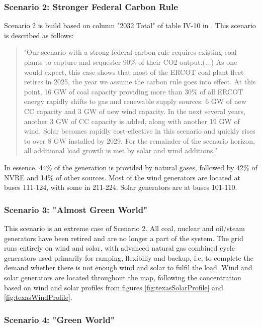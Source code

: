 \documentclass[12pt,LUDisStyle,twosided]{book}
\begin{document}
\subsubsection{Scenario 2: Stronger Federal Carbon Rule}

Scenario 2 is build based on column "2032 Total" of table IV-10 in \cite{shavel}. This scenario is described as follows:

\begin{quotation}
"Our scenario with a strong federal carbon rule requires existing coal plants to capture and sequester 90\% of their CO2 output.(...)
As one would expect, this case shows that most of the ERCOT coal plant fleet retires in 2025, the year we assume the carbon rule goes into effect. At this point, 16 GW of coal capacity providing more than 30\% of all ERCOT energy rapidly shifts to gas and renewable supply sources: 6 GW of new CC capacity and 3 GW of new wind capacity. In the next several years, another 3 GW of CC capacity is added, along with another 19 GW of wind. Solar becomes rapidly cost-effective in this scenario and quickly rises to over 8 GW installed by 2029. For the remainder of the scenario horizon, all additional load growth is met by solar and wind additions.”
\end{quotation}

In essence, 44\% of the generation is provided by natural gases, followed by 42\% of NVRE and 14\% of other sources. Most of the wind generators are located at buses 111-124, with some in 211-224. Solar generators are at buses 101-110.


\subsubsection{Scenario 3: "Almost Green World"}

This scenario is an extreme case of Scenario 2. All coal, nuclear and oil/steam generators have been retired and are no longer a part of the system. The grid runs entirely on wind and solar, with advanced natural gas combined cycle generators used primarily for ramping, flexibiliy and backup, i.e, to complete the demand whether there is not enough wind and solar to fulfil the load. Wind and solar generators are located throughout the map, following the concentration based on wind and solar profiles from figures \ref{fig:texasSolarProfile} and \ref{fig:texasWindProfile}.

\subsubsection{Scenario 4: "Green World"}
\end{document}
